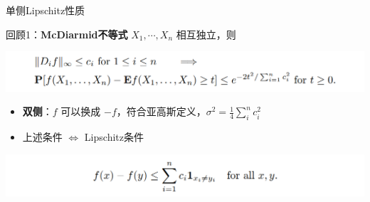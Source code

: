 \documentclass{beamer}
\begin{document}
\begin{frame}{单侧Lipschitz性质}

回顾1：\textbf{McDiarmid不等式} $X_1, \cdots, X_n$ 相互独立，则

\begin{center}
    \includegraphics[width=1.0\textwidth, frame]{figures/4-20-001.png}
\end{center}

\begin{itemize}
    \item \textbf{双侧}：$f$ 可以换成 $-f$，符合亚高斯定义，$\sigma^2=\frac{1}{4} \sum_i^n c_i^2$
    \item 上述条件 $\iff$ Lipschitz条件
\end{itemize}

\begin{center}
    \includegraphics[width=1.0\textwidth, frame]{figures/4-20-003.png}
\end{center}

\end{frame}
\end{document}
